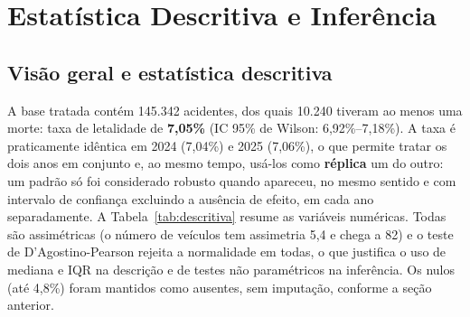 
\section{Estatística Descritiva e Inferência}\label{sec:estatistica}

\subsection{Visão geral e estatística descritiva}

A base tratada contém 145.342 acidentes, dos quais 10.240 tiveram ao menos uma morte: taxa de letalidade de \textbf{7,05\%} (IC 95\% de Wilson: 6,92\%–7,18\%). A taxa é praticamente idêntica em 2024 (7,04\%) e 2025 (7,06\%), o que permite tratar os dois anos em conjunto e, ao mesmo tempo, usá-los como \textbf{réplica} um do outro: um padrão só foi considerado robusto quando apareceu, no mesmo sentido e com intervalo de confiança excluindo a ausência de efeito, em cada ano separadamente. A Tabela~\ref{tab:descritiva} resume as variáveis numéricas. Todas são assimétricas (o número de veículos tem assimetria 5,4 e chega a 82) e o teste de D'Agostino-Pearson rejeita a normalidade em todas, o que justifica o uso de mediana e IQR na descrição e de testes não paramétricos na inferência. Os nulos (até 4,8\%) foram mantidos como ausentes, sem imputação, conforme a seção anterior.

\begin{table}[!htbp]
\centering
\small
\caption{Estatística descritiva das variáveis numéricas (n = 145.342).}\label{tab:descritiva}
\end{table}

